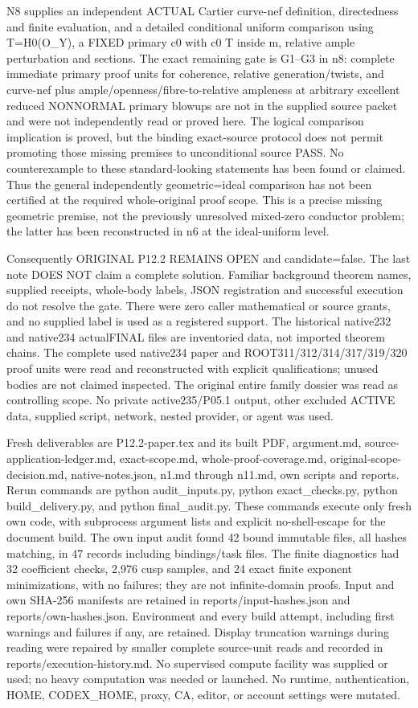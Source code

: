 \documentclass[11pt]{article}
\begin{document}
N8 supplies an independent ACTUAL Cartier curve-nef definition, directedness and finite evaluation, and a detailed conditional uniform comparison using T=H0(O\_Y), a FIXED primary c0 with c0 T inside m, relative ample perturbation and sections. The exact remaining gate is G1--G3 in n8: complete immediate primary proof units for coherence, relative generation/twists, and curve-nef plus ample/openness/fibre-to-relative ampleness at arbitrary excellent reduced NONNORMAL primary blowups are not in the supplied source packet and were not independently read or proved here. The logical comparison implication is proved, but the binding exact-source protocol does not permit promoting those missing premises to unconditional source PASS. No counterexample to these standard-looking statements has been found or claimed. Thus the general independently geometric=ideal comparison has not been certified at the required whole-original proof scope. This is a precise missing geometric premise, not the previously unresolved mixed-zero conductor problem; the latter has been reconstructed in n6 at the ideal-uniform level.

Consequently ORIGINAL P12.2 REMAINS OPEN and candidate=false. The last note DOES NOT claim a complete solution. Familiar background theorem names, supplied receipts, whole-body labels, JSON registration and successful execution do not resolve the gate. There were zero caller mathematical or source grants, and no supplied label is used as a registered support. The historical native232 and native234 actualFINAL files are inventoried data, not imported theorem chains. The complete used native234 paper and ROOT311/312/314/317/319/320 proof units were read and reconstructed with explicit qualifications; unused bodies are not claimed inspected. The original entire family dossier was read as controlling scope. No private active235/P05.1 output, other excluded ACTIVE data, supplied script, network, nested provider, or agent was used.

Fresh deliverables are P12.2-paper.tex and its built PDF, argument.md, source-application-ledger.md, exact-scope.md, whole-proof-coverage.md, original-scope-decision.md, native-notes.json, n1.md through n11.md, own scripts and reports. Rerun commands are python audit\_inputs.py, python exact\_checks.py, python build\_delivery.py, and python final\_audit.py. These commands execute only fresh own code, with subprocess argument lists and explicit no-shell-escape for the document build. The own input audit found 42 bound immutable files, all hashes matching, in 47 records including bindings/task files. The finite diagnostics had 32 coefficient checks, 2,976 cusp samples, and 24 exact finite exponent minimizations, with no failures; they are not infinite-domain proofs. Input and own SHA-256 manifests are retained in reports/input-hashes.json and reports/own-hashes.json. Environment and every build attempt, including first warnings and failures if any, are retained. Display truncation warnings during reading were repaired by smaller complete source-unit reads and recorded in reports/execution-history.md. No supervised compute facility was supplied or used; no heavy computation was needed or launched. No runtime, authentication, HOME, CODEX\_HOME, proxy, CA, editor, or account settings were mutated.
\end{document}
